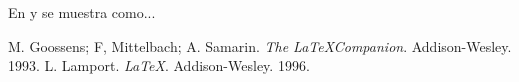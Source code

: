 \documentclass{article}
\begin{document}
	
	
	En \cite{Goossens} y \cite{Lamport} se muestra como...
\begin{thebibliography}{99}
	 M. Goossens; F, Mittelbach; A. Samarin.
	{\it The \LaTeX Companion}. Addison-Wesley. 1993.
	 L. Lamport. {\it \LaTeX}. Addison-Wesley. 1996.
\end{thebibliography}
\end{document}
